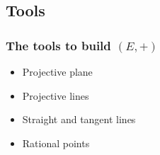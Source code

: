 \subsection{Tools}

\begin{frame}[t]
    \frametitle{The tools to build $\left( E,+ \right) $}
    \begin{itemize}
        \item Projective plane


        \item Projective lines


        \item Straight and tangent lines


        \item Rational points

    \end{itemize}
\end{frame}
